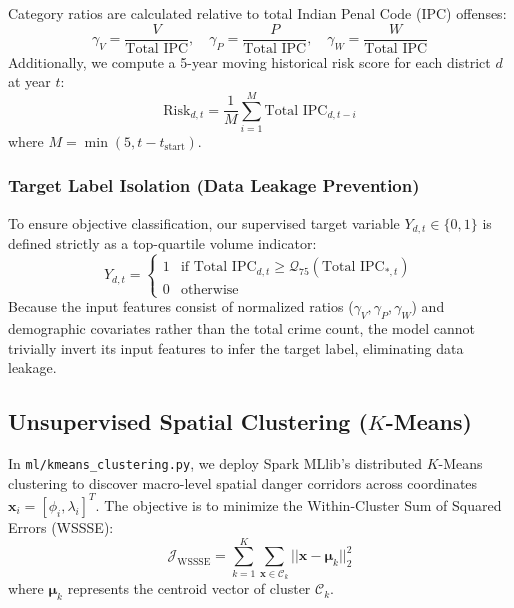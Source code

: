 \documentclass[conference]{IEEEtran}
\begin{document}
Category ratios are calculated relative to total Indian Penal Code (IPC) offenses:
\begin{equation}
    \gamma_V = \frac{V}{\text{Total IPC}}, \quad \gamma_P = \frac{P}{\text{Total IPC}}, \quad \gamma_W = \frac{W}{\text{Total IPC}}
\end{equation}
Additionally, we compute a 5-year moving historical risk score for each district $d$ at year $t$:
\begin{equation}
    \text{Risk}_{d,t} = \frac{1}{M} \sum_{i=1}^{M} \text{Total IPC}_{d, t-i}
\end{equation}
where $M = \min(5, t - t_{\text{start}})$.

\subsubsection{Target Label Isolation (Data Leakage Prevention)}
To ensure objective classification, our supervised target variable $Y_{d,t} \in \{0, 1\}$ is defined strictly as a top-quartile volume indicator:
\begin{equation}
    Y_{d,t} = 
    \begin{cases} 
      1 & \text{if } \text{Total IPC}_{d,t} \ge \mathcal{Q}_{75}(\text{Total IPC}_{*,t}) \\
      0 & \text{otherwise}
    \end{cases}
\end{equation}
Because the input features consist of normalized ratios ($\gamma_V, \gamma_P, \gamma_W$) and demographic covariates rather than the total crime count, the model cannot trivially invert its input features to infer the target label, eliminating data leakage.

\subsection{Unsupervised Spatial Clustering ($K$-Means)}
In \texttt{ml/kmeans\_clustering.py}, we deploy Spark MLlib's distributed $K$-Means clustering to discover macro-level spatial danger corridors across coordinates $\mathbf{x}_i = [\phi_i, \lambda_i]^T$. The objective is to minimize the Within-Cluster Sum of Squared Errors (WSSSE):
\begin{equation}
    \mathcal{J}_{\text{WSSSE}} = \sum_{k=1}^{K} \sum_{\mathbf{x} \in \mathcal{C}_k} ||\mathbf{x} - \boldsymbol{\mu}_k||_2^2
\end{equation}
where $\boldsymbol{\mu}_k$ represents the centroid vector of cluster $\mathcal{C}_k$. 
\end{document}
